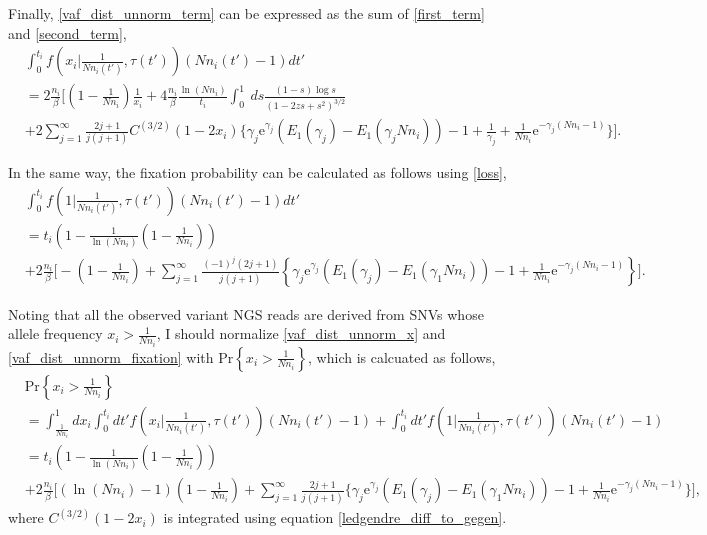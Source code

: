 \documentclass[12pt]{article}
\begin{document}
Finally, \eqref{vaf_dist_unnorm_term} can be expressed as the sum of \eqref{first_term} and \eqref{second_term},
\begin{align}
   & \int_{0}^{t_i} f\left(x_i\Big|\frac{1}{Nn_i(t')}, \tau(t')\right) (Nn_i(t') - 1) dt'\\
   & = 2\frac{n_i}{\beta} \Biggl[(1 - \frac{1}{Nn_i})\frac{1}{x_i} + 4\frac{n_i}{\beta}\frac{\ln(Nn_i)}{t_i} \int_{0}^{1} \: ds \frac{(1-s) \log s}{(1 - 2zs + s^2)^{3/2}}\\
   & + 2 \sum_{j=1}^{\infty}\frac{2j+1}{j(j+1)} C^{(3/2)}(1-2x_i)  \biggl\{ \gamma_j \mathrm{e}^{\gamma_j} \left(E_1(\gamma_j) - E_1(\gamma_j Nn_i)\right) - 1 + \frac{1}{\gamma_j} + \frac{1}{Nn_i}  \mathrm{e}^{-\gamma_j (Nn_i - 1)}
   \Biggr\}
   \Biggr].\label{vaf_dist_unnorm_x}
\end{align}

In the same way, the fixation probability can be calculated as follows using \eqref{loss},
\begin{align}
  & \int_{0}^{t_i} f\left(1\Big|\frac{1}{Nn_i(t')}, \tau(t')\right) (Nn_i(t') - 1) dt'\\
 & = t_i \left(1 - \frac{1}{\ln(Nn_i)}\left(1 - \frac{1}{Nn_i}\right)\right)\\
  & + 2\frac{n_i}{\beta} \Bigg[-(1 - \frac{1}{Nn_i}) + \sum_{j=1}^{\infty}\frac{(-1)^{j}(2j+1)}{j(j+1)} \left\{ \gamma_j \mathrm{e}^{\gamma_j} \left(E_1(\gamma_j) - E_1(\gamma_1 Nn_i)\right) - 1 + \frac{1}{Nn_i}  \mathrm{e}^{-\gamma_j (Nn_i - 1)}
 \right\}
 \Bigg].\label{vaf_dist_unnorm_fixation}
\end{align}

Noting that all the observed variant NGS reads are derived from SNVs whose allele frequency $x_i > \frac{1}{Nn_i}$, I should normalize \eqref{vaf_dist_unnorm_x} and \eqref{vaf_dist_unnorm_fixation} with $\mathrm{Pr}\left\{x_i > \frac{1}{Nn_i}\right\}$, which is calcuated as follows,
\begin{align}
 & \mathrm{Pr}\left\{ x_i > \frac{1}{Nn_i}\right\}\nonumber\\
 & =  \int_{\frac{1}{Nn_i}}^{1} dx_i \int_{0}^{t_i} dt' f\left(x_i\Big|\frac{1}{Nn_i(t')}, \tau(t')\right) (Nn_i(t') - 1) + \int_{0}^{t_i} dt' f\left(1\Big|\frac{1}{Nn_i(t')}, \tau(t')\right) (Nn_i(t') - 1)\nonumber\\
 & = t_i \left(1 - \frac{1}{\ln(Nn_i)}\left(1 - \frac{1}{Nn_i}\right)\right)\nonumber\\
 & + 2\frac{n_i}{\beta} \Bigg[(\ln(Nn_i) -1)(1 - \frac{1}{Nn_i}) + \sum_{j=1}^{\infty}\frac{2j+1}{j(j+1)} \bigl\{ \gamma_j \mathrm{e}^{\gamma_j} \left(E_1(\gamma_j) - E_1(\gamma_1 Nn_i)\right) - 1 + \frac{1}{Nn_i}  \mathrm{e}^{-\gamma_j (Nn_i - 1)}
 \bigr\}
 \Bigg],\label{vaf_dist_unnorm_partition}
\end{align}
where $C^{(3/2)}(1-2x_i)$ is integrated using equation \eqref{ledgendre_diff_to_gegen}.
\end{document}
